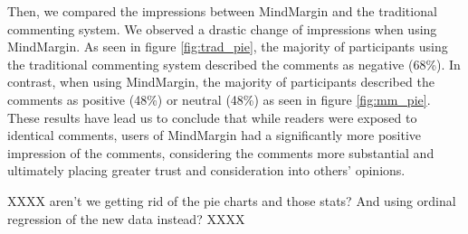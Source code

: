 Then, we compared the impressions between MindMargin and the traditional commenting system. We observed a drastic change of impressions when using MindMargin. As seen in figure \ref{fig:trad_pie}, the majority of participants using the traditional commenting system described the comments as negative (68\%). In contrast, when using MindMargin, the majority of participants described the comments as positive (48\%) or neutral (48\%) as seen in figure \ref{fig:mm_pie}. These results have lead us to conclude that while readers were exposed to identical comments, users of MindMargin had a significantly more positive impression of the comments, considering the comments more substantial and ultimately placing greater trust and consideration into others' opinions.

XXXX aren't we getting rid of the pie charts and those stats? And using ordinal regression of the new data instead? XXXX


